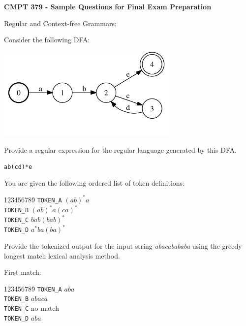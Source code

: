 \documentclass[12pt]{article}
\begin{document}

\begin{center}
{\Large\bf
CMPT 379 - Sample Questions for Final Exam Preparation}\\
\end{center}

\bigskip

\begin{exe}


\ex\label{cfg} Regular and Context-free Grammars:

\begin{xlist}

{\ex Consider the following DFA:

\begin{center}
\includegraphics[width=3.5in]{figures/quiz1-dfa1}
\end{center}

Provide a regular expression for the regular language generated by this DFA.

\begin{soln}
\texttt{ab(cd)*e}
\end{soln}
}

{\ex You are given the following ordered list of token 
definitions:
\begin{tabbing}
123456789\=\kill
{\tt TOKEN\_A} \> $(ab)^\ast a$ \\
{\tt TOKEN\_B} \> $(ab)^\ast a (ca)^\ast$ \\
{\tt TOKEN\_C} \> $bab(bab)^\ast$ \\
{\tt TOKEN\_D} \> $a^\ast ba(ba)^\ast$
\end{tabbing}

Provide the tokenized output for the input string {\em abacabababa} using
the greedy longest match lexical analysis method.
\begin{soln}
\par\noindent First match:
\begin{tabbing}
123456789\=\kill
{\tt TOKEN\_A} \> $aba$ \\
{\tt TOKEN\_B} \> $abaca$ \\
{\tt TOKEN\_C} \> \textrm{no match} \\
{\tt TOKEN\_D} \> $aba$ 
\end{tabbing}


\end{soln}}
\end{xlist}
\end{exe}
\end{document}
